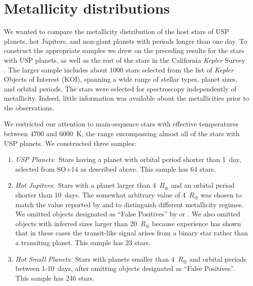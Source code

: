 \documentclass[twocolumn]{aastex6}
\begin{document}
\section{Metallicity distributions}
\label{sec:met}

We wanted to compare the metallicity distribution of the host stars of
USP planets, hot Jupiters, and non-giant planets with periods longer
than one day.  To construct the appropriate samples we drew on the
preceding results for the stars with USP planets, as well as the rest
of the stars in the California {\it Kepler} Survey
\citep{Petigura+2017}.  The larger sample includes about 1000 stars
selected from the list of {\it Kepler} Objects of Interest (KOI),
spanning a wide range of stellar types, planet sizes, and orbital
periods. The stars were selected for spectroscopy independently of
metallicity. Indeed, little information was available about the
metallicities prior to the observations.

We restricted our attention to main-sequence stars with effective
temperatures between 4700 and 6000~K, the range encompassing almost
all of the stars with USP planets.  We constructed three samples:
\begin{enumerate}

\item {\it USP Planets}:~Stars having a planet with orbital period shorter
  than 1~day, selected from SO+14 as described above. This sample has
  64 stars.

\item {\it Hot Jupiters}:~Stars with a planet larger than 4~$R_\oplus$
  and an orbital period shorter than 10~days. The somewhat arbitrary
  value of 4~$R_\oplus$ was chosen to match the value reported by
  \citet{Buchhave+2012} and \citet{Buchhave+2014} to distinguish
  different metallicity regimes. We omitted objects designated as
  ``False Positives'' by \citet{Twicken+2016} or
  \citet{Santerne+2016}.  We also omitted objects with inferred sizes
  larger than 20~$R_\oplus$ because experience has shown that in these
  cases the transit-like signal arises from a binary star rather than
  a transiting planet.  This sample has 23 stars.

\item {\it Hot Small Planets}:~Stars with planets smaller than
  4~$R_\oplus$ and orbital periods between 1-10~days, after omitting
  objects designated as ``False Positives''.  This sample has 246
  stars.

\end{enumerate}
\end{document}
